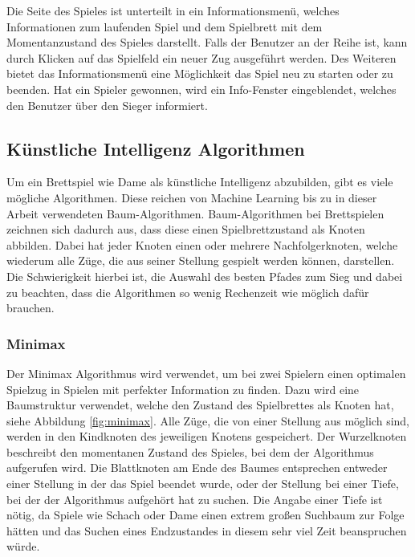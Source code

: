 \documentclass[12pt,a4paper,bibliography=totocnumbered,listof=totocnumbered]{article}
\begin{document}
Die Seite des Spieles ist unterteilt in ein Informationsmenü, welches Informationen zum laufenden Spiel und dem Spielbrett mit dem
Momentanzustand des Spieles darstellt. Falls der Benutzer an der Reihe ist, kann durch Klicken auf das Spielfeld ein neuer Zug ausgeführt werden.
Des Weiteren bietet das Informationsmenü eine Möglichkeit das Spiel neu zu starten oder zu beenden. 
Hat ein Spieler gewonnen, wird ein Info-Fenster eingeblendet, welches den Benutzer über den Sieger informiert.


\subsection{Künstliche Intelligenz Algorithmen}
Um ein Brettspiel wie Dame als künstliche Intelligenz abzubilden, gibt es viele mögliche Algorithmen.
Diese reichen von Machine Learning bis zu in dieser Arbeit verwendeten Baum-Algorithmen.
Baum-Algorithmen bei Brettspielen zeichnen sich dadurch aus, dass diese einen Spielbrettzustand als Knoten abbilden.
Dabei hat jeder Knoten einen oder mehrere Nachfolgerknoten, welche wiederum alle Züge, die aus seiner Stellung gespielt werden können, darstellen.
Die Schwierigkeit hierbei ist, die Auswahl des besten Pfades zum Sieg und dabei zu beachten, dass die Algorithmen so wenig Rechenzeit wie möglich 
dafür brauchen.

\subsubsection{Minimax}
\label{chap:Minimax}
Der Minimax Algorithmus wird verwendet, um bei zwei Spielern einen optimalen Spielzug in Spielen mit perfekter Information 
zu finden. Dazu wird eine Baumstruktur verwendet, welche den Zustand des Spielbrettes als Knoten hat, siehe Abbildung \ref{fig:minimax}.
Alle Züge, die von einer Stellung aus möglich sind, werden in den Kindknoten des jeweiligen Knotens gespeichert.
Der Wurzelknoten beschreibt den momentanen Zustand des Spieles, bei dem der Algorithmus aufgerufen wird. Die Blattknoten am Ende des Baumes
entsprechen entweder einer Stellung in der das Spiel beendet wurde, oder der Stellung bei einer Tiefe, bei der der Algorithmus 
aufgehört hat zu suchen. Die Angabe einer Tiefe ist nötig,
da Spiele wie Schach oder Dame einen extrem großen Suchbaum zur Folge hätten und das Suchen eines Endzustandes in diesem sehr viel Zeit
beanspruchen würde. \cite{MinimaxComparison}
\end{document}
